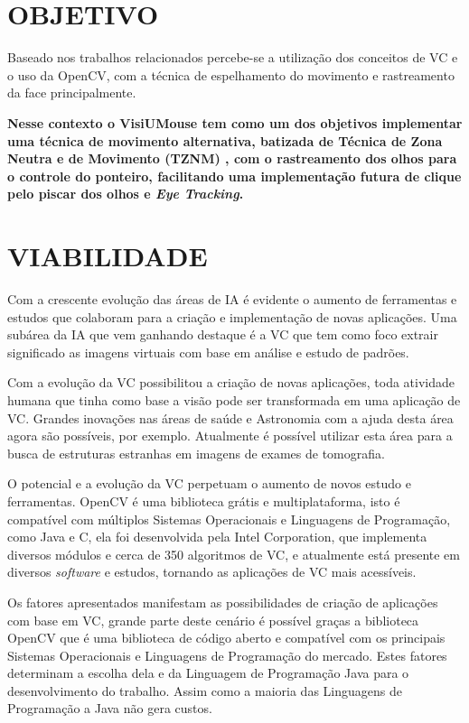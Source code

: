 \section{OBJETIVO}\label{sub:objeto}

Baseado nos trabalhos relacionados percebe-se a utilização dos conceitos de VC e o uso da OpenCV, com a técnica de espelhamento do movimento e rastreamento da face principalmente. 



\textbf{Nesse contexto o VisiUMouse tem como um dos objetivos implementar uma técnica de movimento alternativa, batizada de Técnica de Zona Neutra e de Movimento (TZNM) , com o rastreamento dos olhos para o controle do ponteiro, facilitando uma implementação futura de clique pelo piscar dos olhos e \textit{Eye Tracking}.}



\section{VIABILIDADE}\label{Sub:viabilidade}

Com a crescente evolução das áreas de IA é evidente o aumento de ferramentas e estudos que colaboram para a criação e implementação de novas aplicações. Uma subárea da IA que vem ganhando destaque é a VC que tem como foco extrair significado as imagens virtuais com base em análise e estudo de padrões.

Com a evolução da VC possibilitou a criação de novas aplicações, toda atividade humana que tinha como base a visão pode ser transformada em uma aplicação de VC. Grandes inovações nas áreas de saúde e Astronomia com a ajuda desta área agora são possíveis, por exemplo. Atualmente é possível utilizar esta área para a busca de estruturas estranhas em imagens de exames de tomografia. 
    
O potencial e a evolução da VC perpetuam o aumento de novos estudo e ferramentas. OpenCV é uma biblioteca grátis e multiplataforma, isto é compatível com múltiplos Sistemas Operacionais e Linguagens de Programação, como Java e C, ela foi desenvolvida pela Intel Corporation, que implementa diversos módulos e cerca de 350 algoritmos de VC, e atualmente está presente em diversos \textit{software} e estudos, tornando as aplicações de VC mais acessíveis.  

Os fatores apresentados manifestam as possibilidades de criação de aplicações com base em VC, grande parte deste cenário é possível graças a biblioteca OpenCV que é uma biblioteca de código aberto e compatível com os principais Sistemas Operacionais e Linguagens de Programação do mercado. Estes fatores determinam a escolha dela e da Linguagem de Programação Java para o desenvolvimento do trabalho. Assim como a maioria das Linguagens de Programação a Java não gera custos.

